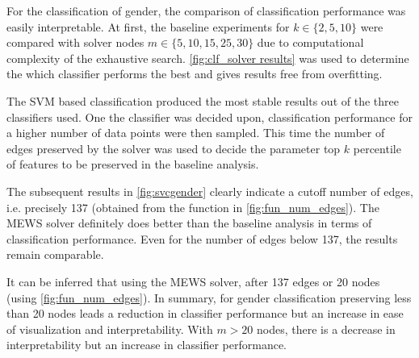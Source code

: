 \documentclass[msthesis.tex]{subfiles}
\begin{document}
For the classification of gender, the comparison of classification performance was easily interpretable. At first, the baseline experiments for $k \in \{2,5,10\}$ were compared with solver nodes $m \in \{5,10,15,25,30\}$ due to computational complexity of the exhaustive search. \autoref{fig:clf_solver results} was used to determine the which classifier performs the best and gives results free from overfitting. 

The SVM based classification produced the most stable results out of the three classifiers used. 
One the classifier was decided upon, classification performance for a higher number of data points were then sampled. This time the number of edges preserved by the solver was used to decide the parameter top $k$ percentile of features to be preserved in the baseline analysis. 

The subsequent results in \autoref{fig:svcgender} clearly indicate a cutoff number of edges, i.e. precisely 137 (obtained from the function in \autoref{fig:fun_num_edges}). The MEWS solver definitely does better than the baseline analysis in terms of classification performance. Even for the number of edges below 137, the results remain comparable. 

It can be inferred that using the \gls{MEWS} solver, after 137 edges or 20 nodes (using \autoref{fig:fun_num_edges}). In summary, for gender classification preserving less than 20 nodes leads a reduction in classifier performance but an increase in ease of visualization and interpretability. With $m> 20$ nodes, there is a decrease in interpretability but an increase in classifier performance.
\end{document}
